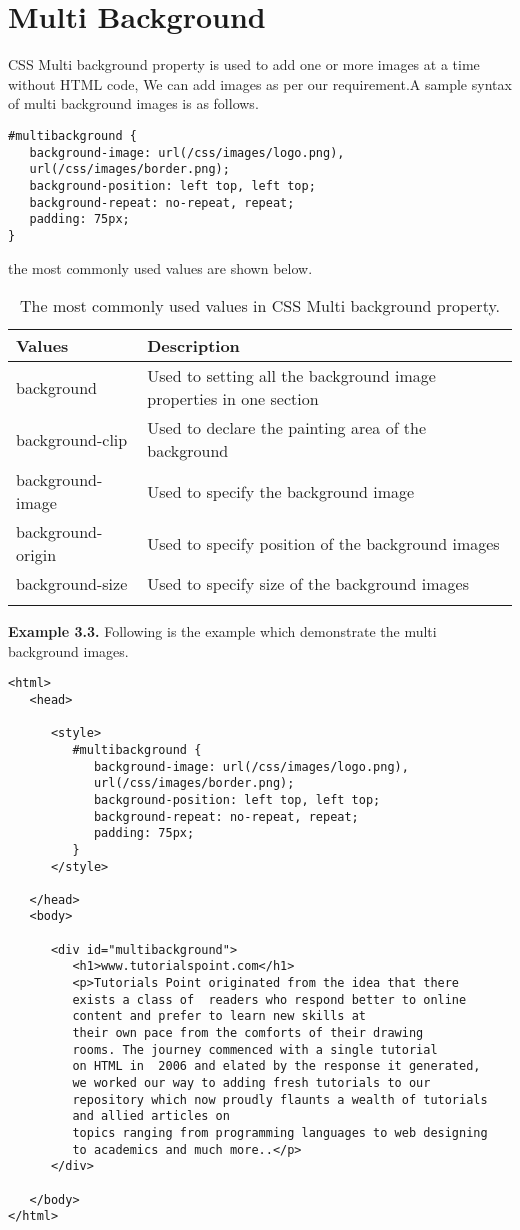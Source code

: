 \documentclass[a4paper,oneside]{book}
\numberwithin{equation}{chapter}
\begin{document}
\section{Multi Background}
CSS Multi background property is used to add one or more images at a time without HTML code, We can add images as per our requirement.A sample syntax of multi background images is as follows.
\begin{verbatim}
#multibackground {
   background-image: url(/css/images/logo.png), 
   url(/css/images/border.png);
   background-position: left top, left top;
   background-repeat: no-repeat, repeat;
   padding: 75px;
}
\end{verbatim}
the most commonly used values are shown below.
\begin{center}
\begin{longtable}{|l|p{8cm}|}
\hline
\textbf{Values} & \textbf{Description}\\
\hline
background & Used to setting all the background image properties in one section\\
\hline
background-clip & Used to declare the painting area of the background\\
\hline
background-image & Used to specify the background image\\
\hline
background-origin & Used to specify position of the background images\\
\hline
background-size & Used to specify size of the background images \\
\hline
\caption{The most commonly used values in CSS Multi background property.}
\end{longtable}
\end{center}
\textbf{Example 3.3.} Following is the example which demonstrate the multi background images.
\begin{verbatim}
<html>
   <head>
   
      <style>
         #multibackground {
            background-image: url(/css/images/logo.png), 
            url(/css/images/border.png);
            background-position: left top, left top;
            background-repeat: no-repeat, repeat;
            padding: 75px;
         }
      </style>
      
   </head>
   <body>
   
      <div id="multibackground">
         <h1>www.tutorialspoint.com</h1>
         <p>Tutorials Point originated from the idea that there 
         exists a class of  readers who respond better to online 
         content and prefer to learn new skills at 
         their own pace from the comforts of their drawing 
         rooms. The journey commenced with a single tutorial 
         on HTML in  2006 and elated by the response it generated, 
         we worked our way to adding fresh tutorials to our 
         repository which now proudly flaunts a wealth of tutorials 
         and allied articles on 
         topics ranging from programming languages to web designing
         to academics and much more..</p>
      </div>
      
   </body>
</html> 
\end{verbatim}
\end{document}
